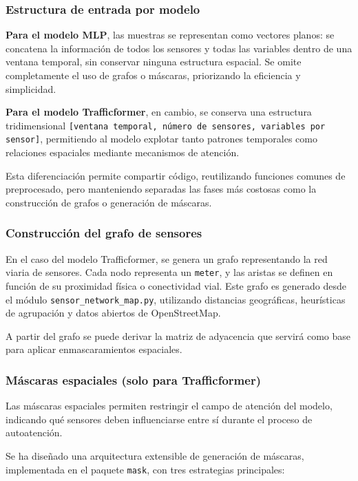 \subsubsection*{Estructura de entrada por modelo}

\textbf{Para el modelo MLP}, las muestras se representan como vectores planos: se concatena la información de todos los sensores y todas las variables dentro de una ventana temporal, sin conservar ninguna estructura espacial. Se omite completamente el uso de grafos o máscaras, priorizando la eficiencia y simplicidad.

\textbf{Para el modelo Trafficformer}, en cambio, se conserva una estructura tridimensional \texttt{[ventana temporal, número de sensores, variables por sensor]}, permitiendo al modelo explotar tanto patrones temporales como relaciones espaciales mediante mecanismos de atención.

Esta diferenciación permite compartir código, reutilizando funciones comunes de preprocesado, pero manteniendo separadas las fases más costosas como la construcción de grafos o generación de máscaras.

\subsubsection*{Construcción del grafo de sensores}

En el caso del modelo Trafficformer, se genera un grafo representando la red viaria de sensores. Cada nodo representa un \texttt{meter}, y las aristas se definen en función de su proximidad física o conectividad vial. Este grafo es generado desde el módulo \texttt{sensor\_network\_map.py}, utilizando distancias geográficas, heurísticas de agrupación y datos abiertos de OpenStreetMap.

A partir del grafo se puede derivar la matriz de adyacencia que servirá como base para aplicar enmascaramientos espaciales.

\subsubsection*{Máscaras espaciales (solo para Trafficformer)}

Las máscaras espaciales permiten restringir el campo de atención del modelo, indicando qué sensores deben influenciarse entre sí durante el proceso de autoatención.

Se ha diseñado una arquitectura extensible de generación de máscaras, implementada en el paquete \texttt{mask}, con tres estrategias principales:

